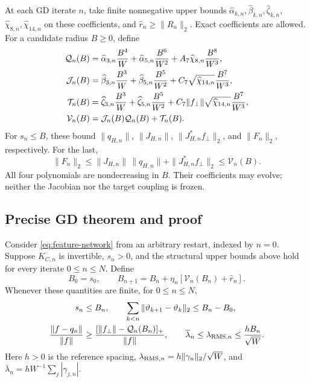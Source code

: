 At each GD iterate $n$, take finite nonnegative upper bounds
$\widehat\alpha_{k,n},\widehat\beta_{k,n},\widehat\zeta_{k,n}$,
$\widehat\chi_{8,n},\widehat\chi_{14,n}$ on these coefficients, and
$\widehat r_n\ge\|R_n\|_2$. Exact coefficients are allowed.
For a candidate radius $B\ge0$, define
\begin{align}
 \mathcal Q_n(B)&=
 \widehat\alpha_{3,n}\frac{B^4}{W}
 +\widehat\alpha_{5,n}\frac{B^6}{W^2}
 +A_7\widehat\chi_{8,n}\frac{B^8}{W^3},\notag\\
 \mathcal J_n(B)&=
 \widehat\beta_{3,n}\frac{B^3}{W}
 +\widehat\beta_{5,n}\frac{B^5}{W^2}
 +C_7\sqrt{\widehat\chi_{14,n}}\frac{B^7}{W^3},\notag\\
 \mathcal T_n(B)&=
 \widehat\zeta_{3,n}\frac{B^3}{W}
 +\widehat\zeta_{5,n}\frac{B^5}{W^2}
 +C_7\|f_\perp\|\sqrt{\widehat\chi_{14,n}}\frac{B^7}{W^3},\notag\\
 \mathcal V_n(B)&=\mathcal J_n(B)\mathcal Q_n(B)+\mathcal T_n(B).
 \label{eq:feature-envelopes}
\end{align}
For $s_n\le B$, these bound $\|q_{H,n}\|$, $\|J_{H,n}\|$,
$\|J_{H,n}^*f_\perp\|_2$, and $\|F_n\|_2$, respectively. For the last,
\begin{equation}
 \|F_n\|_2
 \le\|J_{H,n}\|\,\|q_{H,n}\|+\|J_{H,n}^*f_\perp\|_2
 \le\mathcal V_n(B).
 \label{eq:feature-force}
\end{equation}
All four polynomials are nondecreasing in $B$. Their coefficients may evolve;
neither the Jacobian nor the target coupling is frozen.

\subsection{Precise GD theorem and proof}
\begin{theorem}
\label{thm:feature-precise}
Consider \eqref{eq:feature-network} from an arbitrary restart, indexed by
$n=0$. Suppose $K_{C,n}$ is invertible, $s_n>0$, and the structural
upper bounds above hold for every iterate $0\le n\le N$.
Define
\begin{equation}
 B_0=s_0,\qquad
 B_{n+1}=B_n+\eta_n[\mathcal V_n(B_n)+\widehat r_n].
 \label{eq:feature-recurrence}
\end{equation}
Whenever these quantities are finite, for $0\le n\le N$,
\begin{align}
 s_n&\le B_n,\qquad
 \sum_{k<n}\|\vartheta_{k+1}-\vartheta_k\|_2\le B_n-B_0,
 \label{eq:feature-travel}\\
 \frac{\|f-q_n\|}{\|f\|}
 &\ge\frac{[\|f_\perp\|-\mathcal Q_n(B_n)]_+}{\|f\|},\qquad
 \overline\lambda_n\le\lambda_{{\rm RMS},n}\le\frac{hB_n}{\sqrt W}.
 \label{eq:feature-consequences}
\end{align}
Here $h>0$ is the reference spacing,
$\lambda_{{\rm RMS},n}=h\|\gamma_n\|_2/\sqrt W$, and
$\overline\lambda_n=hW^{-1}\sum_j|\gamma_{j,n}|$.
\end{theorem}

